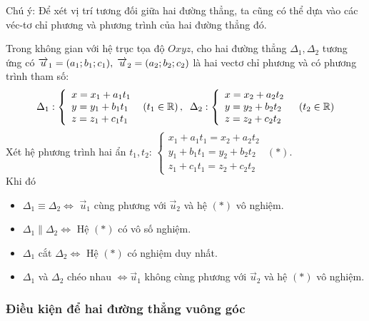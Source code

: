 \begin{note} Chú ý: Để xét vị trí tương đối giữa hai đường thẳng, ta cũng có thể dựa vào các véc-tơ chỉ phương và phương trình của hai đường thẳng đó.
\end{note}
 Trong không gian với hệ trục tọa độ $Oxyz$, cho hai đường thẳng $\Delta _{1} ,\Delta _{2} $ tương ứng có $\overrightarrow{u}_{1} =(a_{1} ;b_{1} ;c_{1} ),{\rm \; }\overrightarrow{u}_{2} =(a_{2} ;b_{2} ;c_{2} )$ là hai vectơ chỉ phương và có phương trình tham số:
\[\Delta _{1} :\left\{\begin{array}{l} {x=x_{1} +a_{1} t_{1} } \\ {y=y_{1} +b_{1} t_{1} } \\ {z=z_{1} +c_{1} t_{1} } \end{array}\right. {\rm \; }\left(t_{1} \in  \mathbb{R}\right),{\rm \; \; }\Delta _{2} :\left\{\begin{array}{l} {x=x_{2} +a_{2} t_{2} } \\ {y=y_{2} +b_{2} t_{2} } \\ {z=z_{2} +c_{2} t_{2} } \end{array}\right. {\rm \; \; }\left(t_{2} \in  \mathbb{R}\right)\] 
 Xét hệ phương trình hai ẩn $t_{1} ,t_{2} $: $\left\{\begin{array}{l} {x_{1} +a_{1} t_{1} =x_{2} +a_{2} t_{2} } \\ {y_{1} +b_{1} t_{1} =y_{2} +b_{2} t_{2} } \\ {z_{1} +c_{1} t_{1} =z_{2} +c_{2} t_{2} } \end{array}\right. $ \quad$\left(*\right)$.\\
 Khi đó
\begin{itemize}
	\item  $\Delta _{1} \equiv \Delta _{2} \Leftrightarrow $ $\overrightarrow{u}_{1} $ cùng phương với $\overrightarrow{u}_{2} $ và hệ $\left(*\right)$ vô nghiệm.
	\item  $\Delta _{1} \parallel \Delta _{2} \Leftrightarrow $ Hệ $\left(*\right)$ có vô số nghiệm.
	\item  $\Delta _{1} $ cắt $\Delta _{2} \Leftrightarrow $ Hệ $\left(*\right)$ có nghiệm duy nhất.
	\item  $\Delta _{1} $ và $\Delta _{2} $ chéo nhau $\Leftrightarrow \overrightarrow{u}_{1} $ không cùng phương với $\overrightarrow{u}_{2} $ và hệ $\left(*\right)$ vô nghiệm.
\end{itemize}

\subsubsection{Điều kiện để hai đường thẳng vuông góc}

